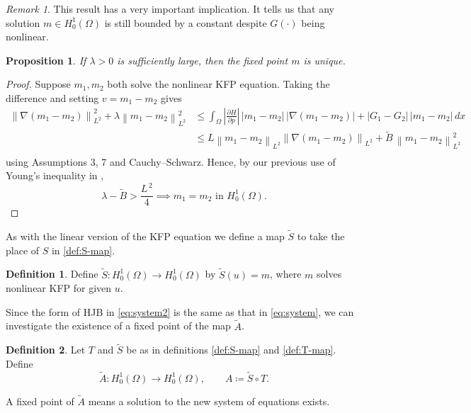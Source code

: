 \documentclass[11pt]{article}
\numberwithin{equation}{section}
\newtheorem{proposition}[proposition]{Proposition}
\theoremstyle{definition}
\newtheorem{definition}[definition]{Definition}
\theoremstyle{remark}
\newtheorem{remark}[remark]{Remark}
\newcommand{\Honez}{H_0^1(\Omega)}
\newcommand{\Hp}{\frac{\partial H}{\partial p}}
\newcommand{\norm}[1]{\left\lVert #1 \right\rVert}
\begin{document}
\begin{remark}
  This result has a very important implication. It tells us that any solution $m \in \Honez$ is still bounded by a constant despite $G(\cdot)$ being nonlinear. 
\end{remark}
\begin{proposition}
If $\lambda>0$ is sufficiently large, then the fixed point $m$ is unique.
\end{proposition}
\label{prop:uniqueness2}
\begin{proof}
Suppose $m_1,m_2$ both solve the nonlinear KFP equation. Taking the difference and setting $v=m_1-m_2$ gives
\begin{align*}
\norm{\nabla(m_1-m_2)}_{L^2}^2 +\lambda\norm{m_1-m_2}_{L^2}^2
&\le \int_\Omega |\Hp|\,|m_1-m_2|\,|\nabla(m_1 -m_2)| + |G_1-G_2|\,|m_1-m_2|\,dx\\
&\le L \norm{m_1-m_2}_{L^2}\norm{\nabla(m_1-m_2)}_{L^2} + \tilde{B}\,\norm{m_1-m_2}_{L^2}^2\\
\end{align*}
using Assumptions 3, 7 and Cauchy--Schwarz. Hence, by our previous use of Young's inequality in ,
\[\lambda - \tilde{B} >\frac{L^{\,2}}{4}\implies m_1=m_2 \text{ in }\Honez.\]
\end{proof}

As with the linear version of the KFP equation we define a map $\tilde{S}$ to take the place of $S$ in \cref{def:S-map}.
\begin{definition}
\label{def:s_tilde}
Define $\tilde{S}:\Honez\to\Honez$ by $\tilde{S}(u)=m$, where $m$ solves nonlinear KFP for given $u$.
\end{definition}
Since the form of HJB in \cref{eq:system2} is the same as that in \cref{eq:system}, we can investigate the existence of a fixed point of the map $\tilde{A}$.
\begin{definition}
\label{def:A_tilde}
Let $T$ and $\tilde{S}$ be as in definitions \ref{def:S-map} and \ref{def:T-map}. Define
\[\tilde{A}:\Honez\to\Honez,\qquad A \coloneqq \tilde{S}\circ T.\]
\end{definition}

A fixed point of $\tilde{A}$ means a solution to the new system of equations exists. 
\end{document}
